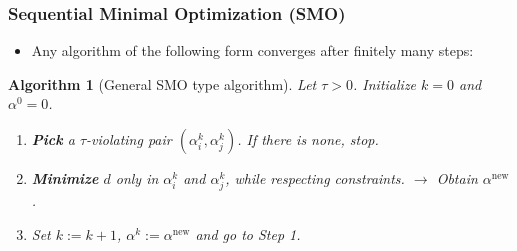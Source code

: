 \documentclass[12pt, compress]{beamer}
\newcommand{\titleC}{Sequential Minimal Optimization (SMO)}
\newtheorem{algorithm}{Algorithm}
\begin{document}
\begin{frame}
\frametitle{\titleC}
	\begin{itemize}
		\item Any algorithm of the following form converges after finitely many steps:
	\end{itemize}
	\begin{algorithm}[General SMO type algorithm]\label{GSMO} Let $\tau > 0$. Initialize $k = 0 $ and $\alpha^0 = 0$.
		\begin{enumerate}
			\item \textbf{\alert{Pick}} a $\tau$-violating pair $(\alpha^k_i, \alpha^k_j)$. If there is none, stop.
			\item \textbf{\alert{Minimize}} $d$ only in $\alpha^k_i$ and $\alpha^k_j$, while respecting constraints. $\rightarrow$ Obtain \textbf{\alert{$\alpha^{\text{new}}$}}.
			\item Set $k := k+1$, $\alpha^k := \alpha^{\text{new}}$ and go to Step 1.
		\end{enumerate}
	\end{algorithm}
\end{frame}
\end{document}
